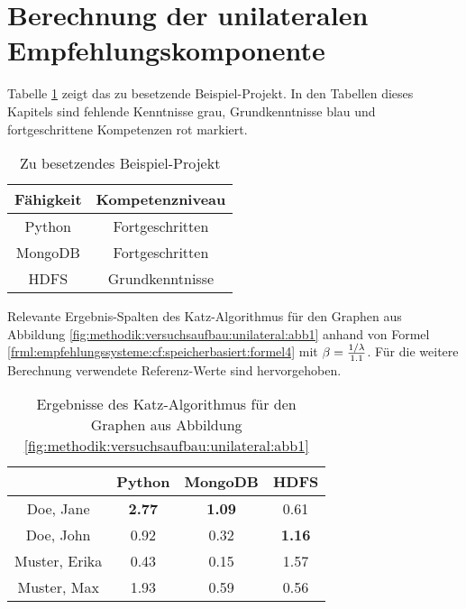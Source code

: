 \section{Berechnung der unilateralen Empfehlungskomponente}
\label{ch:nebenrechnungen:unilateral}
Tabelle \ref{tbl:berechnungDerKatzZentralitaetPseudoMitarbeiter:tbl1} zeigt das zu besetzende Beispiel-Projekt. In den Tabellen dieses Kapitels sind fehlende Kenntnisse grau, Grundkenntnisse blau und fortgeschrittene Kompetenzen rot markiert.
\begin{table}[h]
	\centering
	\begin{tabular}{c|c}
		Fähigkeit & Kompetenzniveau \\
		\hline
		Python  & \cellcolor{usercolor}Fortgeschritten\\
		MongoDB & \cellcolor{usercolor}Fortgeschritten\\
		HDFS    & \cellcolor{itemcolor}Grundkenntnisse
	\end{tabular}
	\caption{Zu besetzendes Beispiel-Projekt}
	\label{tbl:berechnungDerKatzZentralitaetPseudoMitarbeiter:tbl1}
\end{table}

Relevante Ergebnis-Spalten des Katz-Algorithmus für den Graphen aus Abbildung \ref{fig:methodik:versuchsaufbau:unilateral:abb1} anhand von Formel \ref{frml:empfehlungssysteme:cf:speicherbasiert:formel4} mit $\beta = \frac{1/\lambda}{1.1}$. Für die weitere Berechnung verwendete Referenz-Werte sind hervorgehoben.

\begin{table}[h]
	\centering
	\begin{tabular}{c|c|c|c}
		& Python & MongoDB & HDFS\\ 
		\hline
		Doe, Jane     & \cellcolor{usercolor}\textbf{2.77} & \cellcolor{itemcolor}\textbf{1.09} & \cellcolor{exxetagray}0.61\\
		Doe, John     & \cellcolor{exxetagray}0.92 & \cellcolor{exxetagray}0.32 & \cellcolor{itemcolor}\textbf{1.16}\\
		Muster, Erika & \cellcolor{exxetagray}0.43 & \cellcolor{exxetagray}0.15 & \cellcolor{usercolor}1.57\\
		Muster, Max   & \cellcolor{itemcolor}1.93 & \cellcolor{exxetagray}0.59 & \cellcolor{exxetagray}0.56
	\end{tabular}
	\caption{Ergebnisse des Katz-Algorithmus für den Graphen aus Abbildung \ref{fig:methodik:versuchsaufbau:unilateral:abb1}}
	\label{tbl:berechnungDerKatzZentralitaetPseudoMitarbeiter:tbl2}
\end{table}

